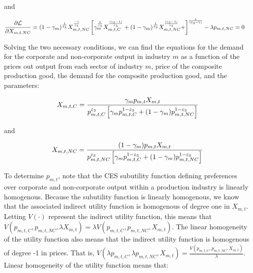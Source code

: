    and
   
\begin{equation} \label{eqn:comp_output_foc_NC}
	\begin{split}
       	&  \frac{\partial \mathcal{L}}{\partial X_{m,t,NC}} = (1-\gamma_{m})^{\frac{1}{\varepsilon_{3}}} X_{m,t,NC}^{\frac{-1}{\varepsilon_{3}}} \left[\gamma_{m}^{\frac{1}{\varepsilon_{3}}}X_{m,t,C}^{\frac{(\varepsilon_{3}-1)}{\varepsilon_{3}}}+(1-\gamma_{m})^{\frac{1}{\varepsilon_{3}}}X_{m,t,NC}^{\frac{(\varepsilon_{3}-1)}{\varepsilon_{3}}}+\right]^{\frac{1}{(\varepsilon_{3}-1)}} - \lambda p_{m,t,NC} = 0
	\end{split}
\end{equation}
    
    Solving the two necessary conditions, we can find the equations for the demand for the corporate and non-corporate output in industry $m$ as a function of the prices out output from each sector of industry $m$, price of the composite production good, the demand for the composite production good, and the parameters:
    
\begin{equation} \label{eqn:demand_XmtC}
	X_{m,t,C} = \frac{\gamma_{m}p_{m,t}X_{m,t}}{p_{m,t,C}^{\varepsilon_{3}}\left[\gamma_{m}p_{m,t,C}^{1-\varepsilon_{3}}+(1-\gamma_{m})p_{m,t,NC}^{1-\varepsilon_{3}}\right]}
\end{equation}
    
    and 
    
    \begin{equation} \label{eqn:demand_XmtC}
	X_{m,t,NC} = \frac{(1-\gamma_{m})p_{m,t}X_{m,t}}{p_{m,t,NC}^{\varepsilon_{3}}\left[\gamma_{m}p_{m,t,C}^{1-\varepsilon_{3}}+(1-\gamma_{m})p_{m,t,NC}^{1-\varepsilon_{3}}\right]}
\end{equation}

To determine $p_{m,t}$, note that the CES subutility function defining preferences over corporate and non-corporate output within a production industry is linearly homogenous.  Because the subutility function is linearly homogenous, we know that the associated indirect utility function is homogenous of degree one in $X_{m,t}$.  Letting $V(\cdot)$ represent the indirect utility function, this means that $V(p_{m,t,C},p_{m,t,NC},\lambda X_{m,t}) = \lambda V(p_{m,t,C},p_{m,t,NC}, X_{m,t})$.  The linear homogeneity of the utility function also means that the indirect utility function is homogenous of degree -1 in prices.  That is, $V(\lambda p_{m,t,C},\lambda p_{m,t,NC}, X_{m,t}) = \frac{V(p_{m,t,C},p_{m,t,NC}, X_{m,t})}{\lambda}$. Linear homogeneity of the utility function means that: 

